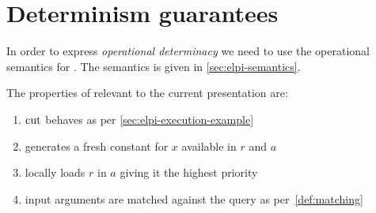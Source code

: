 

\section{Determinism guarantees}
\label{sec:det-guar}

In order to express \emph{operational determinacy}
we need to use the operational semantics for \elpi. The semantics is
given in \cref{sec:elpi-semantics}.



The properties of \runE relevant to the current presentation are:

\begin{enumerate}
\item $\text{cut}$ behaves as per \cref{sec:elpi-execution-example}
\item {} generates a fresh constant for $x$ available in $r$ and $a$
\item {} locally loads $r$ in $a$ giving it the highest priority
\item input arguments are matched against the query as per~\cref{def:matching}
\end{enumerate}



